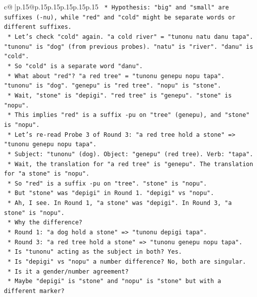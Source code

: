 \documentclass{article}
\begin{document}
{\begin{supertabular}{c@{$\;$}|p{.15\linewidth}@{}p{.15\linewidth}p{.15\linewidth}p{.15\linewidth}p{.15\linewidth}p{.15\linewidth}}
{{{\texttt{        *   Hypothesis: "big" and "small" are suffixes ({-}nu), while "red" and "cold" might be separate words or different suffixes.} \\
\texttt{        *   Let's check "cold" again. "a cold river" = "tunonu natu danu tapa". "tunonu" is "dog" (from previous probes). "natu" is "river". "danu" is "cold".} \\
\texttt{        *   So "cold" is a separate word "danu".} \\
\texttt{        *   What about "red"? "a red tree" = "tunonu genepu nopu tapa". "tunonu" is "dog". "genepu" is "red tree". "nopu" is "stone".} \\
\texttt{        *   Wait, "stone" is "depigi". "red tree" is "genepu". "stone" is "nopu".} \\
\texttt{        *   This implies "red" is a suffix {-}pu on "tree" (genepu), and "stone" is "nopu".} \\
\texttt{        *   Let's re{-}read Probe 3 of Round 3: "a red tree hold a stone" => "tunonu genepu nopu tapa".} \\
\texttt{        *   Subject: "tunonu" (dog). Object: "genepu" (red tree). Verb: "tapa".} \\
\texttt{        *   Wait, the translation for "a red tree" is "genepu". The translation for "a stone" is "nopu".} \\
\texttt{        *   So "red" is a suffix {-}pu on "tree". "stone" is "nopu".} \\
\texttt{        *   But "stone" was "depigi" in Round 1. "depigi" vs "nopu".} \\
\texttt{        *   Ah, I see. In Round 1, "a stone" was "depigi". In Round 3, "a stone" is "nopu".} \\
\texttt{        *   Why the difference?} \\
\texttt{        *   Round 1: "a dog hold a stone" => "tunonu depigi tapa".} \\
\texttt{        *   Round 3: "a red tree hold a stone" => "tunonu genepu nopu tapa".} \\
\texttt{        *   Is "tunonu" acting as the subject in both? Yes.} \\
\texttt{        *   Is "depigi" vs "nopu" a number difference? No, both are singular.} \\
\texttt{        *   Is it a gender/number agreement?} \\
\texttt{        *   Maybe "depigi" is "stone" and "nopu" is "stone" but with a different marker?} \\
}}}
\end{supertabular}}
\end{document}
